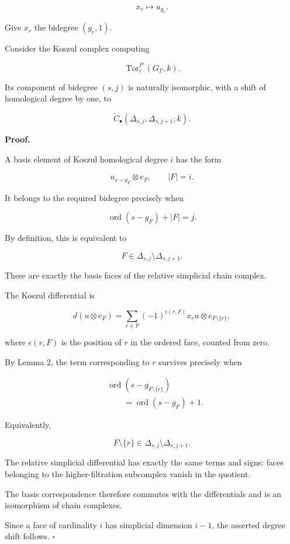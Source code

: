 \documentclass[11pt]{article}
\begin{document}
\[
x_r\longmapsto u_{g_r}.
\]

Give \(x_r\) the bidegree \((g_r,1)\).

Consider the Koszul complex computing

\[
\operatorname{Tor}^{P}_i(G_\Gamma,k).
\]

Its component of bidegree \((s,j)\) is naturally isomorphic, with a shift of homological degree by one, to

\[
\widetilde C_\bullet
(\Delta_{s,j},\Delta_{s,j+1};k).
\]

\textbf{Proof.}

A basis element of Koszul homological degree \(i\) has the form

\[
u_{s-g_F}\otimes e_F,
\qquad |F|=i.
\]

It belongs to the required bidegree precisely when

\[
\operatorname{ord}(s-g_F)+|F|=j.
\]

By definition, this is equivalent to

\[
F\in
\Delta_{s,j}\setminus\Delta_{s,j+1}.
\]

These are exactly the basis faces of the relative simplicial chain complex.

The Koszul differential is

\[
d(u\otimes e_F)=
\sum_{r\in F}
(-1)^{\epsilon(r,F)}
x_ru\otimes e_{F\setminus\{r\}},
\]

where \(\epsilon(r,F)\) is the position of \(r\) in the ordered face, counted from zero.

By Lemma 2, the term corresponding to \(r\) survives precisely when

\[
\begin{aligned}
&\operatorname{ord}(s-g_{F\setminus\{r\}})\\
&\qquad=
\operatorname{ord}(s-g_F)+1.
\end{aligned}
\]

Equivalently,

\[
F\setminus\{r\}
\in
\Delta_{s,j}\setminus\Delta_{s,j+1}.
\]

The relative simplicial differential has exactly the same terms and signs: faces belonging to the higher-filtration subcomplex vanish in the quotient.

The basis correspondence therefore commutes with the differentials and is an isomorphism of chain complexes.

Since a face of cardinality \(i\) has simplicial dimension \(i-1\), the asserted degree shift follows. \(\square\)
\end{document}
